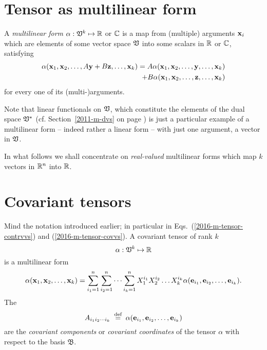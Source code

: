 \section{Tensor as multilinear form}

A {\em multilinear form}
$\alpha :{ \frak V }^k \mapsto {\Bbb R}$  or  ${\Bbb C}$
is a map from (multiple) arguments ${\bf x}_i$ which are elements of some vector space  $\frak V$
into some scalars in ${\Bbb R}$ or ${\Bbb C}$,  satisfying
\begin{equation}
\begin{split}
\alpha ( {\bf x}_1,{\bf x}_2,\ldots , A {\bf y}+ B {\bf z}, \ldots ,{\bf x}_k)
=
A\alpha ( {\bf x}_1,{\bf x}_2,\ldots , {\bf y}, \ldots ,{\bf x}_k)   \\
   \qquad +
B\alpha ( {\bf x}_1,{\bf x}_2,\ldots , {\bf z}, \ldots ,{\bf x}_k)
\end{split}
\end{equation}
for every one of its (multi-)arguments.

{
\color{blue}
Note that linear functionals on ${\frak V}$, which constitute the elements of the dual space ${\frak V}^\ast$
(cf. Section~\ref{2011-m-dvs} on page \pageref{2011-m-dvs}) is just a particular example of a  multilinear form
-- indeed rather a  linear form -- with just one argument, a vector in ${\frak V}$.
\eexample
}

In what follows we shall concentrate on {\em real-valued} multilinear forms which map
$k$ vectors in
${\Bbb R}^n$
into
${\Bbb R}$.



\section{Covariant tensors}


Mind the notation introduced earlier; in particular in Eqs.~(\ref{2016-m-tensor-contrvvs}) and (\ref{2016-m-tensor-covvs}).
A covariant tensor of rank $k$
\begin{equation}
\alpha:{ \frak V }^k \mapsto {\Bbb R}
\end{equation}
is a multilinear form
\begin{equation}
\alpha ( {\bf x}_1,{\bf x}_2,\ldots ,{\bf x}_k)=
\sum_{i_1=1}^n
\sum_{i_2=1}^n
\cdots
\sum_{i_k=1}^n
X^{i_1}_1 X^{i_2}_2\ldots X^{i_k}_k
\alpha ( {\bf e}_{i_1},{\bf e}_{i_2},\ldots ,{\bf e}_{i_k}).
\end{equation}
The
\begin{equation}
A_{{i_1}{i_2}\cdots {i_k}}
\stackrel{{\tiny \textrm{ def }}}{=}
\alpha ( {\bf e}_{i_1},{\bf e}_{i_2},\ldots ,{\bf e}_{i_k})
\end{equation}
 are the
{\em covariant components} or
{\em covariant coordinates}
of the tensor $\alpha $ with respect to the basis
${\mathfrak B}$.

